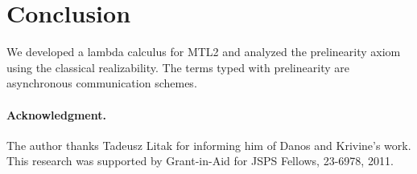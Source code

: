 \documentclass[envcountsame]{llncs}
\begin{document}


\section{Conclusion}
\label{sec:conclude}
We developed a lambda calculus for MTL2 and
analyzed the prelinearity axiom using
the classical realizability.  The terms typed with prelinearity are
asynchronous communication schemes.

\paragraph{Acknowledgment.}
The author thanks Tadeusz Litak for informing him of Danos and
Krivine's work.
This research was supported by
Grant-in-Aid for JSPS Fellows, 23-6978, 2011.




\end{document}
